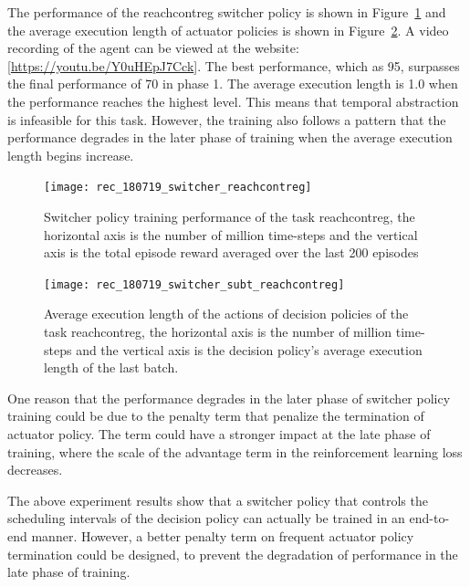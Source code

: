 The performance of the reachcontreg switcher policy is shown in Figure~\ref{rec_switcher_reachcontreg} and the average execution length of actuator policies is shown in Figure~\ref{rec_switcher_subt_reachcontreg}. A video recording of the agent can be viewed at the website:  [\url{https://youtu.be/Y0uHEpJ7Cck}]. The best performance, which as 95, surpasses the final performance of 70 in phase 1. The average execution length is 1.0 when the performance reaches the highest level. This means that temporal abstraction is infeasible for this task. However, the training also follows a pattern that the performance degrades in the later phase of training when the average execution length begins increase.
\begin{figure}[!htbp]
	\centering
	\texttt{[image: rec\_180719\_switcher\_reachcontreg]}
	\caption{Switcher policy training performance of the task reachcontreg, the horizontal axis is the number of million time-steps and the vertical axis is the total episode reward averaged over the last 200 episodes}
	\label{rec_switcher_reachcontreg}
\end{figure}

\begin{figure}[!htbp]
	\centering
	\texttt{[image: rec\_180719\_switcher\_subt\_reachcontreg]}
	\caption{Average execution length of the actions of decision policies of the task reachcontreg, the horizontal axis is the number of million time-steps and the vertical axis is the decision policy's average execution length of the last batch.}
	\label{rec_switcher_subt_reachcontreg}
\end{figure}

One reason that the performance degrades in the later phase of switcher policy training could be due to the penalty term that penalize the termination of actuator policy. The term could have a stronger impact at the late phase of training, where the scale of the advantage term in the reinforcement learning loss decreases.

The above experiment results show that a switcher policy that controls the scheduling intervals of the decision policy can actually be trained in an end-to-end manner. However, a better penalty term on frequent actuator policy termination could be designed, to prevent the degradation of performance in the late phase of training. 